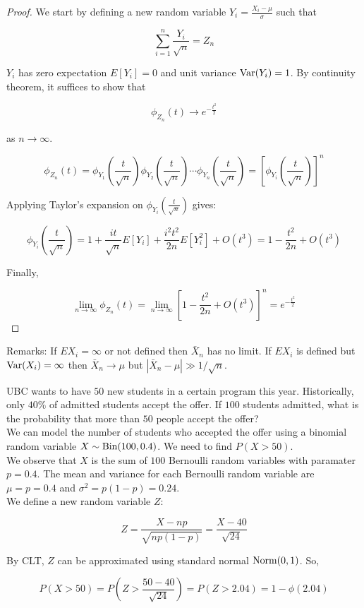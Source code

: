 \begin{proof}
	We start by defining a new random variable $Y_i=\frac{X_i-\mu}{\sigma}$ such that
	
	\[\sum_{i=1}^n \frac{Y_i}{\sqrt{n}}=Z_n\]
	
	$Y_i$ has zero expectation $E[Y_i]=0$ and unit variance $\operatorname{Var}(Y_i)=1$. By continuity theorem, it suffices to show that
	
	\[\phi_{Z_n}(t)\to e^{-\frac{t^2}{2}}\]
	
	as $n\to\infty$.
	
	\[\phi_{Z_n}(t)=\phi_{Y_1}\left(\frac{t}{\sqrt{n}}\right)\phi_{Y_2}\left(\frac{t}{\sqrt{n}}\right)\cdots \phi_{Y_n}\left(\frac{t}{\sqrt{n}}\right)=\left[\phi_{Y_i}\left(\frac{t}{\sqrt{n}}\right)\right]^n\]
	
	Applying Taylor's expansion on $\phi_{Y_i}\left(\frac{t}{\sqrt{n}}\right)$ gives:
	
	\[\phi_{Y_i}\left(\frac{t}{\sqrt{n}}\right)=1+\frac{it}{\sqrt{n}}E[Y_i]+\frac{i^2t^2}{2n}E[Y_i^2]+O(t^3)=1-\frac{t^2}{2n}+O(t^3)\]
	
	Finally,
	
	\[\lim_{n\to\infty} \phi_{Z_n}(t)=\lim_{n\to\infty} \left[1-\frac{t^2}{2n}+O(t^3)\right]^n=e^{-\frac{t^2}{2}}\]
\end{proof}

Remarks: If $EX_i=\infty$ or not defined then $\bar{X}_n$ has no limit. If $EX_i$ is defined but $\operatorname{Var}(X_i)=\infty$ then $\bar{X}_n \to \mu$ but $|\bar{X}_n - \mu| \gg 1/\sqrt{n}$.

\begin{texample}
	UBC wants to have $50$ new students in a certain program this year. Historically, only $40\%$ of admitted students accept the offer. If $100$ students admitted, what is the probability that more than $50$ people accept the offer? \\
	
	We can model the number of students who accepted the offer using a binomial random variable $X\sim\operatorname{Bin}(100,0.4)$. We need to find $P(X>50)$. \\
	
	We observe that $X$ is the sum of $100$ Bernoulli random variables with paramater $p=0.4$. The mean and variance for each Bernoulli random variable are $\mu=p=0.4$ and $\sigma^2=p(1-p)=0.24$. \\
	
	We define a new random variable $Z$:
	
	\[Z=\frac{X-np}{\sqrt{np(1-p)}}=\frac{X-40}{\sqrt{24}}\]
	
	By CLT, $Z$ can be approximated using standard normal $\operatorname{Norm}(0,1)$. So,
	
	\[P(X>50)=P\left(Z>\frac{50-40}{\sqrt{24}}\right)=P(Z>2.04)=1-\phi(2.04)\]
\end{texample}
